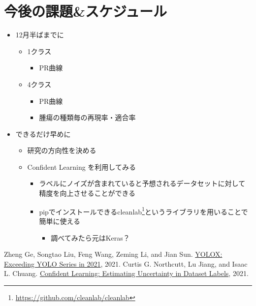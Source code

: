 \documentclass[a4j]{ujarticle}
\begin{document}
    \section{今後の課題\&スケジュール}
        \begin{itemize}
            \item 12月半ばまでに
            \begin{itemize}
                \item 1クラス
                \begin{itemize}
                    \item PR曲線
                \end{itemize}
                \item 4クラス
                \begin{itemize}
                    \item PR曲線
                    \item 腫瘍の種類毎の再現率・適合率
                \end{itemize}
            \end{itemize}
            \item できるだけ早めに
            \begin{itemize}
                \item 研究の方向性を決める
                \item Confident Learning \cite{cleanlab} を利用してみる
                \begin{itemize}
                    \item ラベルにノイズが含まれていると予想されるデータセットに対して精度を向上させることができる
                    \item pipでインストールできるcleanlab\footnote{\url{https://github.com/cleanlab/cleanlab}}というライブラリを用いることで簡単に使える
                    \begin{itemize}
                        \item 調べてみたら元はKeras？
                    \end{itemize}
				\end{itemize}
            \end{itemize}
        \end{itemize}

        \begin{thebibliography}{9}
             Zheng Ge, Songtao Liu, Feng Wang, Zeming Li, and Jian Sun. \href{https://arxiv.org/pdf/2107.08430.pdf}{YOLOX: Exceeding YOLO Series in 2021}, 2021.
             Curtis G. Northcutt, Lu Jiang, and Isaac L. Chuang. \href{https://arxiv.org/pdf/1911.00068.pdf}{Confident Learning: Estimating Uncertainty in Dataset Labels}, 2021.
        \end{thebibliography}
\end{document}
